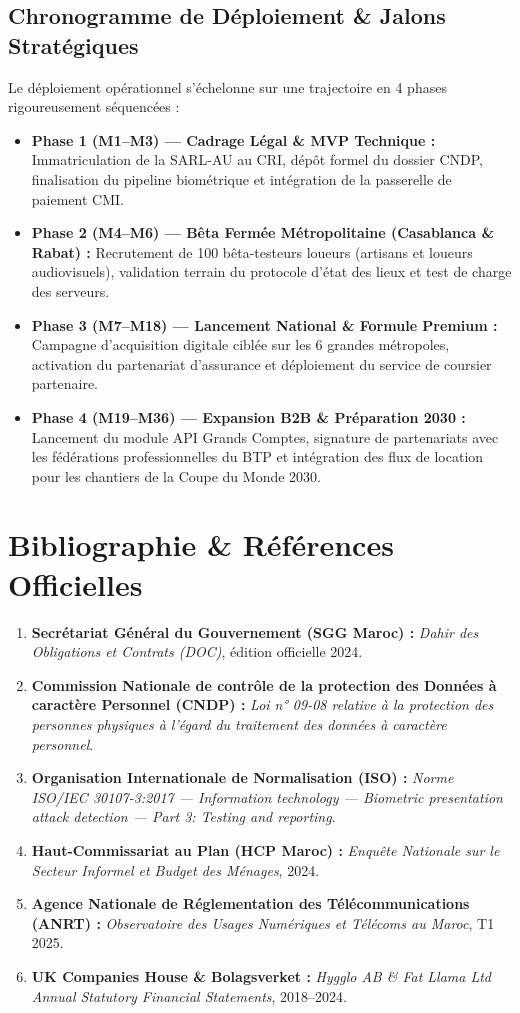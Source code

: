 \documentclass[11pt,a4paper]{report}
\begin{document}
\section{Chronogramme de Déploiement \& Jalons Stratégiques}
Le déploiement opérationnel s'échelonne sur une trajectoire en 4 phases rigoureusement séquencées :
\begin{itemize}[leftmargin=*]
    \item \textbf{Phase 1 (M1--M3) --- Cadrage Légal \& MVP Technique :} Immatriculation de la SARL-AU au CRI, dépôt formel du dossier CNDP, finalisation du pipeline biométrique et intégration de la passerelle de paiement CMI.
    \item \textbf{Phase 2 (M4--M6) --- Bêta Fermée Métropolitaine (Casablanca \& Rabat) :} Recrutement de 100 bêta-testeurs loueurs (artisans et loueurs audiovisuels), validation terrain du protocole d'état des lieux et test de charge des serveurs.
    \item \textbf{Phase 3 (M7--M18) --- Lancement National \& Formule Premium :} Campagne d'acquisition digitale ciblée sur les 6 grandes métropoles, activation du partenariat d'assurance et déploiement du service de coursier partenaire.
    \item \textbf{Phase 4 (M19--M36) --- Expansion B2B \& Préparation 2030 :} Lancement du module API Grands Comptes, signature de partenariats avec les fédérations professionnelles du BTP et intégration des flux de location pour les chantiers de la Coupe du Monde 2030.
\end{itemize}

\chapter*{Bibliographie \& Références Officielles}

\begin{enumerate}[leftmargin=*]
    \item \textbf{Secrétariat Général du Gouvernement (SGG Maroc) :} \textit{Dahir des Obligations et Contrats (DOC)}, édition officielle 2024.
    \item \textbf{Commission Nationale de contrôle de la protection des Données à caractère Personnel (CNDP) :} \textit{Loi n° 09-08 relative à la protection des personnes physiques à l'égard du traitement des données à caractère personnel}.
    \item \textbf{Organisation Internationale de Normalisation (ISO) :} \textit{Norme ISO/IEC 30107-3:2017 --- Information technology — Biometric presentation attack detection — Part 3: Testing and reporting}.
    \item \textbf{Haut-Commissariat au Plan (HCP Maroc) :} \textit{Enquête Nationale sur le Secteur Informel et Budget des Ménages}, 2024.
    \item \textbf{Agence Nationale de Réglementation des Télécommunications (ANRT) :} \textit{Observatoire des Usages Numériques et Télécoms au Maroc}, T1 2025.
    \item \textbf{UK Companies House \& Bolagsverket :} \textit{Hygglo AB \& Fat Llama Ltd Annual Statutory Financial Statements}, 2018--2024.
\end{enumerate}
\end{document}
